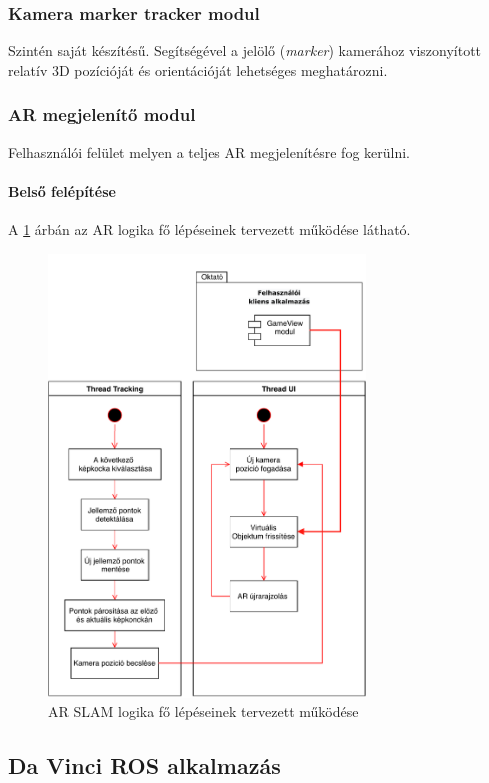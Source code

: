 \documentclass[12pt,a4paper,oneside]{report} %
\begin{document}
\subsubsection{Kamera marker tracker modul}
Szintén saját készítésű. Segítségével a jelölő (\textit{marker}) kamerához viszonyított relatív 3D pozícióját és orientációját lehetséges meghatározni.
\subsubsection{AR megjelenítő modul}
Felhasználói felület melyen a teljes AR megjelenítésre fog kerülni.
\paragraph{Belső felépítése}
A  \ref{fig:arseq} árbán az AR logika fő lépéseinek tervezett működése látható.
\begin{figure}
	\centering
	\includegraphics[width=0.75\textwidth]{dias/arseq}
	\caption{AR SLAM logika fő lépéseinek tervezett működése}%
	\label{fig:arseq}
\end{figure}

\subsection{Da Vinci ROS alkalmazás}
\end{document}
